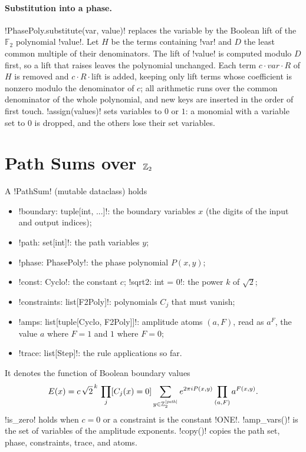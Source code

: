 \paragraph{Substitution into a phase.} \py!PhasePoly.substitute(var, value)! replaces the variable by the Boolean lift of the $\mathbb{F}_2$ polynomial \code!value!. Let $H$ be the terms containing \code!var! and $D$ the least common multiple of their denominators. The lift of \code!value! is computed modulo $D$ first, so a lift that raises leaves the polynomial unchanged. Each term $c\cdot\mathit{var}\cdot R$ of $H$ is removed and $c\cdot R\cdot\mathrm{lift}$ is added, keeping only lift terms whose coefficient is nonzero modulo the denominator of $c$; all arithmetic runs over the common denominator of the whole polynomial, and new keys are inserted in the order of first touch. \py!assign(values)! sets variables to $0$ or $1$: a monomial with a variable set to $0$ is dropped, and the others lose their set variables.

\section{Path Sums over \texorpdfstring{$\mathbb{Z}_{2}$}{Z2}}\label{sec:algebra-pathsum}

\begin{definition}\label{def:algebra-pathsum}
A \py!PathSum! (mutable dataclass) holds
\begin{itemize}
\item \py!boundary: tuple[int, ...]!: the boundary variables $x$ (the digits of the input and output indices);
\item \py!path: set[int]!: the path variables $y$;
\item \py!phase: PhasePoly!: the phase polynomial $P(x,y)$;
\item \py!const: Cyclo!: the constant $c$; \py!sqrt2: int = 0!: the power $k$ of $\sqrt2$;
\item \py!constraints: list[F2Poly]!: polynomials $C_j$ that must vanish;
\item \py!amps: list[tuple[Cyclo, F2Poly]]!: amplitude atoms $(a,F)$, read as $a^{F}$, the value $a$ where $F=1$ and $1$ where $F=0$;
\item \py!trace: list[Step]!: the rule applications so far.
\end{itemize}
It denotes the function of Boolean boundary values
\begin{equation}\label{eq:algebra-pathsum}
E(x)=c\,\sqrt2^{\,k}\,\prod_j[C_j(x)=0]\sum_{y\in\mathbb{Z}_{2}^{|\mathit{path}|}}e^{2\pi i P(x,y)}\prod_{(a,F)}a^{F(x,y)}.
\end{equation}
\py!is_zero! holds when $c=0$ or a constraint is the constant \py!ONE!. \py!amp_vars()! is the set of variables of the amplitude exponents. \py!copy()! copies the path set, phase, constraints, trace, and atoms.
\end{definition}

